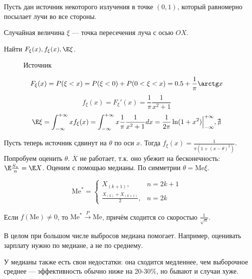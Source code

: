 Пусть дан источник некоторого излучения в точке \((0, 1)\), который равномерно посылает лучи во все стороны.

Случайная величина \(\xi\) --- точка пересечения луча с осью \(OX\).

Найти \(F_\xi(x), f_\xi(x), \E \xi\).

\begin{figure}[h]
    \centering
    \caption{Источник}
\end{figure}

\[F_\xi(x) = P(\xi < x) = P(\xi < 0) + P(0 < \xi < x) = 0.5 + \frac{1}{\pi} \arctg x\]
\[f_\xi(x) = F_\xi'(x) = \frac{1}{\pi} \frac{1}{x^2 + 1}\]
\[\E \xi = \int_{ - \infty }^{ + \infty } x f_\xi(x) = \int_{ - \infty }^{ + \infty } x \frac{1}{\pi} \frac{1}{x^2 + 1} dx = \frac{1}{2 \pi} \ln(1 + x^2) \Big|_{ - \infty }^{ + \infty}, \nexists\]

Пусть теперь источник сдвинут на \(\theta\) по оси \(x\). Тогда \(f_\xi(x) = \frac{1}{\pi (1 + (x - \theta)^2)}\). Попробуем оценить \(\theta\). \(\overline{X}\) не работает, т.к. оно убежит на бесконечность: \(\E \frac{S_n}{n} = \E X\). Оценим с помощью медианы. По симметрии \(\theta = \mathrm{Me} \xi\).

\[\mathrm{Me}^* = \begin{cases}
        X_{(k + 1)},                     & n = 2k + 1 \\
        \frac{X_{(k)} + X_{(k + 1)}}{2}, & n = 2k
    \end{cases}\]

\begin{theorem}
    Если \(f(\mathrm{Me}) \neq 0\), то \(\mathrm{Me}^* \xrightarrow{P} \mathrm{Me}\), причём сходится со скоростью \(\frac{1}{\sqrt{n}}\).
\end{theorem}

В целом при большом числе выбросов медиана помогает. Например, оценивать зарплату нужно по медиане, а не по среднему.

У медианы также есть свои недостатки: она сходится медленнее, чем выборочное среднее --- эффективность обычно ниже на 20-30\%, но бывают и случаи хуже.

